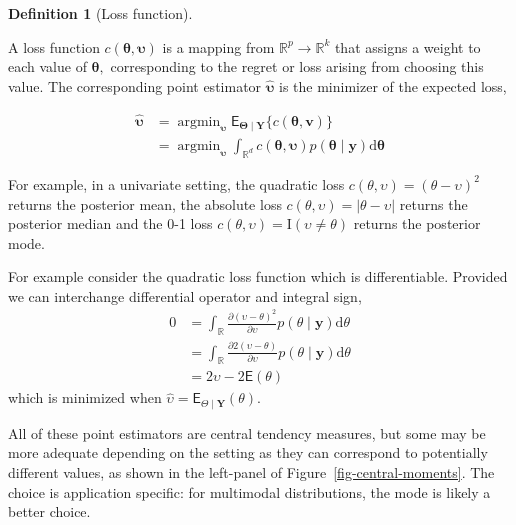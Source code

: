 \documentclass[
  11pt,
  letterpaper,
]{scrbook}
\theoremstyle{definition}
\theoremstyle{plain}
\theoremstyle{plain}
\theoremstyle{plain}
\theoremstyle{definition}
\theoremstyle{definition}
\newtheorem{definition}{Definition}[chapter]
\theoremstyle{plain}
\theoremstyle{plain}
\theoremstyle{remark}
\begin{document}
\begin{definition}[Loss
function]\protect\hypertarget{def-lossfunction}{}\label{def-lossfunction}

A loss function \(c(\boldsymbol{\theta}, \boldsymbol{\upsilon})\) is a
mapping from \(\mathbb{R}^p \to \mathbb{R}^k\) that assigns a weight to
each value of \(\boldsymbol{\theta},\) corresponding to the regret or
loss arising from choosing this value. The corresponding point estimator
\(\widehat{\boldsymbol{\upsilon}}\) is the minimizer of the expected
loss,

\begin{align*}
\widehat{\boldsymbol{\upsilon}} &= \mathop{\mathrm{argmin}}_{\boldsymbol{\upsilon}}\mathsf{E}_{\boldsymbol{\Theta} \mid \boldsymbol{Y}}\{c(\boldsymbol{\theta}, \boldsymbol{v})\} \\&=\mathop{\mathrm{argmin}}_{\boldsymbol{\upsilon}} \int_{\mathbb{R}^d} c(\boldsymbol{\theta}, \boldsymbol{\upsilon})p(\boldsymbol{\theta} \mid \boldsymbol{y}) \mathrm{d} \boldsymbol{\theta}
\end{align*}

\end{definition}

For example, in a univariate setting, the quadratic loss
\(c(\theta, \upsilon) = (\theta-\upsilon)^2\) returns the posterior
mean, the absolute loss \(c(\theta, \upsilon)=|\theta - \upsilon|\)
returns the posterior median and the 0-1 loss
\(c(\theta, \upsilon) = \mathrm{I}(\upsilon \neq \theta)\) returns the
posterior mode.

For example consider the quadratic loss function which is
differentiable. Provided we can interchange differential operator and
integral sign, \begin{align*}
0&= \int_{\mathbb{R}} \frac{\partial (\upsilon-\theta)^2}{\partial \upsilon} p(\theta \mid \boldsymbol{y}) \mathrm{d} \theta 
\\&= \int_{\mathbb{R}} \frac{\partial 2(\upsilon-\theta)}{\partial \upsilon} p(\theta \mid \boldsymbol{y}) \mathrm{d} \theta 
\\& = 2\upsilon - 2 \mathsf{E}(\theta)
\end{align*} which is minimized when
\(\widehat{\upsilon}=\mathsf{E}_{\Theta \mid \boldsymbol{Y}}(\theta)\).

All of these point estimators are central tendency measures, but some
may be more adequate depending on the setting as they can correspond to
potentially different values, as shown in the left-panel of
Figure~\ref{fig-central-moments}. The choice is application specific:
for multimodal distributions, the mode is likely a better choice.
\end{document}
